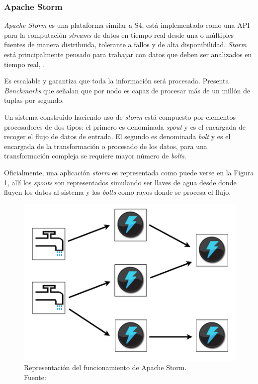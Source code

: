 \subsubsection*{Apache Storm}
\label{arte:SPS:storm}
					
\textit{Apache Storm} es una plataforma similar a S4, está implementado como una API para la computación \textit{streams} de datos en tiempo real desde una o múltiples fuentes de manera distribuida, tolerante a fallos y de alta disponibilidad. \textit{Storm} está principalmente pensado para trabajar con datos que deben ser analizados en tiempo real, \cite{Storm}.

Es escalable y garantiza que toda la información será procesada. Presenta \textit{Benchmarks} que señalan que por nodo es capaz de procesar más de un millón de tuplas por segundo.

Un sistema construido haciendo uso de \textit{storm} está compuesto por elementos procesadores de dos tipos: el primero es denominada \textit{spout} y es el encargada de recoger el flujo de datos de entrada. El segundo es denominada \textit{bolt} y es el encargada de la transformación o procesado de los datos, para una transformación compleja se requiere mayor número de \textit{bolts}.

Oficialmente, una aplicación \textit{storm} es representada como puede verse en la Figura \ref{fig:stormBeLike}, allí los \textit{spouts} son representados simulando ser llaves de agua desde donde fluyen los datos al sistema y los \textit{bolts} como rayos donde se procesa el flujo.

\begin{figure}[H]
	\centering
	\captionsetup{justification=centering}
	\includegraphics[scale=0.6]{images/stormBeLike.png}
	\caption[Representación del funcionamiento de Apache Storm.]{Representación del funcionamiento de Apache Storm.\\Fuente: \cite{StormFigure}}
	\label{fig:stormBeLike}
\end{figure}

